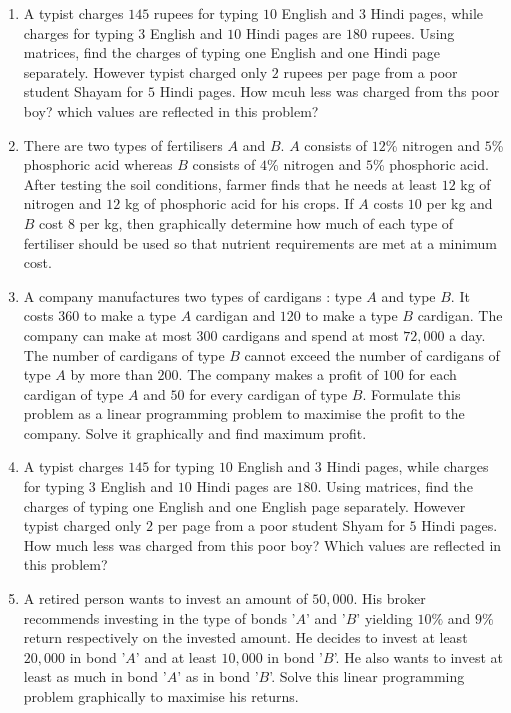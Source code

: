 \begin{enumerate}
	\item A typist charges $145$ rupees for typing $10$ English and $3$ Hindi pages, while charges for typing $3$ English and $10$ Hindi pages are $180$ rupees. Using matrices, 
find the charges of typing one English and one Hindi page separately. 
However typist charged only $2$ rupees per page from a poor student Shayam for $5$ Hindi pages.
How mcuh less was charged from ths poor boy? which values are reflected in this problem?
\item There are two types of fertilisers $A$ and $B$. $A$ consists of $12$\% nitrogen and $5$\% phosphoric acid whereas $B$ consists of $4$\% nitrogen and $5$\% phosphoric acid. After testing the soil conditions, farmer finds that he needs at least $12$ kg of nitrogen and $12$ kg of phosphoric acid for his crops. If $A$ costs \rupee $10$ per kg and $B$ cost \rupee $8$ per kg, then graphically determine how much of each type of fertiliser should be used so that nutrient requirements are met at a minimum cost.
    \item A company manufactures two types of cardigans : type $A$ and type $B$. It costs \rupee $360$ to make a type $A$ cardigan and \rupee $120$ to make a type $B$ cardigan. The company can make at most $300$ cardigans and spend at most \rupee $72,000$ a day. The number of cardigans of type $B$ cannot exceed the number of cardigans of type $A$ by more than $200$. The company makes a profit of \rupee $100$ for each cardigan of type $A$ and \rupee $50$ for every cardigan of type $B$. Formulate this problem as a linear programming problem to maximise the profit to the company. Solve it graphically and find maximum profit.
    \item A typist charges \rupee $145$ for typing $10$ English and $3$ Hindi pages, while charges for typing $3$ English and $10$ Hindi pages are \rupee $180$. Using matrices, find the charges of typing one English and one English page separately. However typist charged only \rupee $2$ per page from a poor student Shyam for $5$ Hindi pages. How much less was charged from this poor boy? Which values are reflected in this problem?

\item A retired person wants to invest an amount of \rupee $50,000$. His broker recommends investing in the type of bonds '$A$' and '$B$' yielding $10\%$ and $9\%$ return respectively on the invested amount. He decides to invest at least \rupee $20,000$ in bond '$A$' and at least \rupee $10,000$ in bond '$B$'. He also wants to invest at least as much in bond '$A$' as in bond '$B$'. Solve this linear programming problem graphically to maximise his returns.

\end{enumerate}
